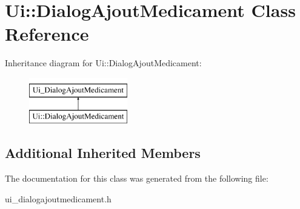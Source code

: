 \hypertarget{classUi_1_1DialogAjoutMedicament}{\section{Ui\-:\-:Dialog\-Ajout\-Medicament Class Reference}
\label{classUi_1_1DialogAjoutMedicament}
}
Inheritance diagram for Ui\-:\-:Dialog\-Ajout\-Medicament\-:\begin{figure}[H]
\begin{center}
\leavevmode
\includegraphics[height=2.000000cm]{classUi_1_1DialogAjoutMedicament}
\end{center}
\end{figure}
\subsection*{Additional Inherited Members}


The documentation for this class was generated from the following file\-:\begin{DoxyCompactItemize}
\item 
ui\-\_\-dialogajoutmedicament.\-h\end{DoxyCompactItemize}
